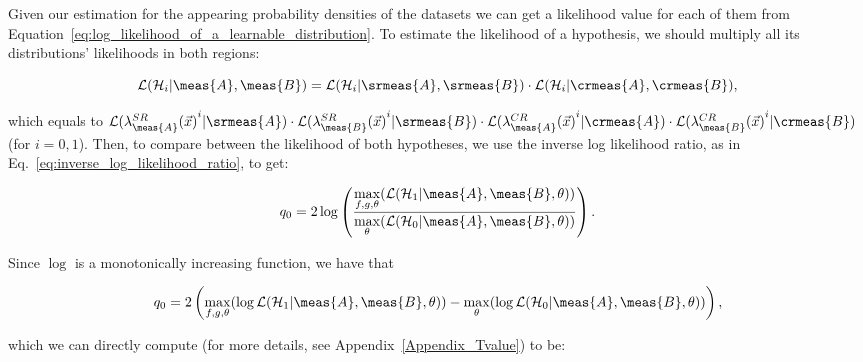 \documentclass[../../ddppaper2.tex]{subfiles}
\begin{document}
Given our estimation for the appearing probability densities of the datasets we can get a likelihood value for each of them from Equation~\ref{eq:log_likelihood_of_a_learnable_distribution}. To estimate the likelihood of a hypothesis, we should multiply all its distributions' likelihoods in both regions:

\begin{equation}
\likelihood(\hypothesis{i} | \meas{A}, \meas{B})
    = \likelihood(\hypothesis{i}|\srmeas{A}, \srmeas{B}) \cdot \likelihood(\hypothesis{i}|\crmeas{A}, \crmeas{B}), 
\end{equation}

\noindent which equals to $\likelihood(\srdist{\meas{A}}^i|\srmeas{A}) \cdot \likelihood(\srdist{\meas{B}}^i|\srmeas{B}) \cdot \likelihood(\crdist{\meas{A}}^i|\crmeas{A}) \cdot \likelihood(\crdist{\meas{B}}^i|\crmeas{B})$ (for $i=0,1$). Then, to compare between the likelihood of both hypotheses, we use the inverse log likelihood ratio, as in Eq.~\ref{eq:inverse_log_likelihood_ratio}, to get:

\begin{equation*}
\invllratio = 2 \log \left(
    \frac{
        \max\limits_{f, g, \nparam} (\likelihood(\hypothesis{1}|\meas{A}, \meas{B}, \nparam))
    }{
        \max\limits_{\nparam} (\likelihood(\nullhypothesis|\meas{A}, \meas{B}, \nparam))
}\right).
\end{equation*}

\noindent Since $\log$ is a monotonically increasing function, we have that

\begin{equation}
\label{eq:high_level_overall_test_statistic}
    \invllratio = 2 \left( {\max\limits_{f, g, \nparam}(\log \likelihood(\hypothesis{1}|\meas{A}, \meas{B}, \nparam))} - {\max\limits_{\nparam}(\log \likelihood(\nullhypothesis|\meas{A}, \meas{B}, \nparam))} \right),
\end{equation}


\noindent which we can directly compute (for more details, see Appendix~\ref{Appendix_Tvalue}) to be:
\end{document}
